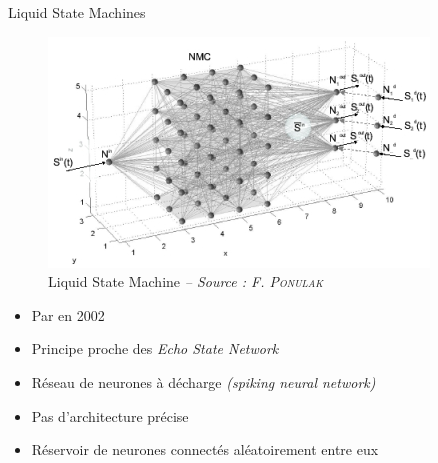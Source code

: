 \begin{frame}{Liquid State Machines}
    \begin{figure}
        \includegraphics[height=.35\textheight,width=\textwidth,keepaspectratio]{images/liquid_state}
        \caption{Liquid State Machine {\scriptsize\it -- Source : F. \textsc{Ponulak}}}
    \end{figure}
    \vspace{-.3cm}
    \begin{itemize}
        \item Par \citeauthor{Maass02} en 2002 \cite{Maass02}
        \item Principe proche des \textit{Echo State Network}
        \item Réseau de neurones à décharge \textit{(spiking neural network)}
        \item Pas d'architecture précise
        \item Réservoir de neurones connectés aléatoirement entre eux
    \end{itemize}
\end{frame}

